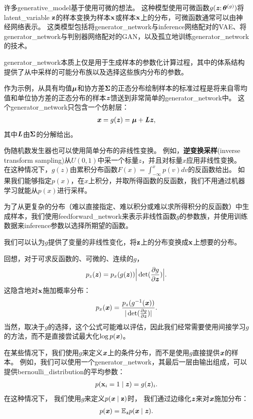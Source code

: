 许多\gls{generative_model}基于使用可微的想法。
这种模型使用可微函数$g(\boldsymbol{\mathit{z}};\boldsymbol{\theta}^{(g)})$将\gls{latent_variable} $\mathbf{z}$的样本变换为样本$\mathbf{x}$或样本$\mathbf{x}$上的分布，可微函数通常可以由神经网络表示。
这类模型包括将\gls{generator_network}与\gls{inference}网络配对的\gls{VAE}、将\gls{generator_network}与判别器网络配对的\gls{GAN}，以及孤立地训练\gls{generator_network}的技术。


\gls{generator_network}本质上仅是用于生成样本的参数化计算过程，其中的体系结构提供了从中采样的可能分布族以及选择这些族内分布的参数。

作为示例，从具有均值$\boldsymbol{\mu}$和协方差$\boldsymbol{\Sigma}$的正态分布绘制样本的标准过程是将来自零均值和单位协方差的正态分布的样本$\boldsymbol{\mathit{z}}$馈送到非常简单的\gls{generator_network}中。 这个\gls{generator_network}只包含一个仿射层：
\begin{align}
 \boldsymbol{\mathit{x}} = g(\boldsymbol{\mathit{z}}) = \boldsymbol{\mu} + \boldsymbol{\mathit{L}} \boldsymbol{\mathit{z}} ,
\end{align}
其中$\boldsymbol{\mathit{L}}$由$\boldsymbol{\Sigma}$的分解给出。


伪随机数发生器也可以使用简单分布的非线性变换。
例如，\textbf{逆变换采样}(inverse transform sampling)\citep{devroye2013non}从$U(0,1)$中采一个标量$z$，并且对标量$x$应用非线性变换。 %
在这种情况下，$g(z)$由累积分布函数$F(x) = \int_{-\infty}^{x} p(v) dv$的反函数给出。
如果我们能够指定$p(x)$，在$x$上积分，并取所得函数的反函数，我们不用通过机器学习就能从$p(x)$进行采样。

为了从更复杂的分布（难以直接指定、难以积分或难以求所得积分的反函数）中生成样本，我们使用\gls{feedforward_network}来表示非线性函数$g$的参数族，并使用训练数据来\gls{inference}参数以选择所期望的函数。

我们可以认为$g$提供了变量的非线性变化，将$\mathbf{z}$上的分布变换成$\mathbf{x}$上想要的分布。

回想，对于可求反函数的、可微的、连续的$g$，
\begin{align}
 p_z(\boldsymbol{\mathit{z}}) = p_x(g(\boldsymbol{\mathit{z}})) \Big | \det (\frac{\partial g}{\partial \boldsymbol{\mathit{z}}}) \Big |.
\end{align}
这隐含地对$\mathbf{x}$施加概率分布：
\begin{align}
 p_x(\boldsymbol{\mathit{x}}) = \frac{p_z(g^{-1}(\boldsymbol{\mathit{x}}))}{ | \det (\frac{\partial g}{\partial \boldsymbol{\mathit{z}}}) |}.
\end{align}
当然，取决于$g$的选择，这个公式可能难以评估，因此我们经常需要使用间接学习$g$的方法，而不是直接尝试最大化$\log p(\boldsymbol{\mathit{x}})$。

在某些情况下，我们使用$g$来定义$\boldsymbol{\mathit{x}}$上的条件分布，而不是使用$g$直接提供$\boldsymbol{\mathit{x}}$的样本。
例如，我们可以使用一个\gls{generator_network}，其最后一层由输出组成，可以提供\gls{bernoulli_distribution}的平均参数：
\begin{align}
 p(\mathbf{x}_i = 1  \mid  \boldsymbol{\mathit{z}}) = g(\boldsymbol{\mathit{z}})_i .
\end{align}
在这种情况下， 我们使用$g$来定义$p(\boldsymbol{\mathit{x}}  \mid  \mathbf{z})$时， 我们通过边缘化$\boldsymbol{\mathit{z}}$来对$\boldsymbol{\mathit{x}}$施加分布：
\begin{align}
 p(\boldsymbol{\mathit{x}}) = \mathbb{E}_{\boldsymbol{\mathit{z}}} p(\boldsymbol{\mathit{x}}  \mid  \boldsymbol{\mathit{z}}).
\end{align}

